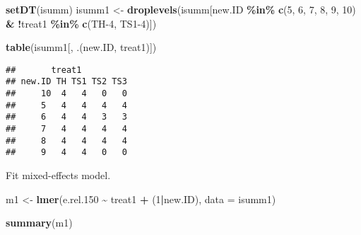\documentclass[
]{article}
\newenvironment{Shaded}{\begin{snugshade}}{\end{snugshade}}
\newcommand{\AttributeTok}[1]{\textcolor[rgb]{0.13,0.29,0.53}{#1}}
\newcommand{\DecValTok}[1]{\textcolor[rgb]{0.00,0.00,0.81}{#1}}
\newcommand{\FloatTok}[1]{\textcolor[rgb]{0.00,0.00,0.81}{#1}}
\newcommand{\FunctionTok}[1]{\textcolor[rgb]{0.13,0.29,0.53}{\textbf{#1}}}
\newcommand{\NormalTok}[1]{#1}
\newcommand{\OtherTok}[1]{\textcolor[rgb]{0.56,0.35,0.01}{#1}}
\newcommand{\SpecialCharTok}[1]{\textcolor[rgb]{0.81,0.36,0.00}{\textbf{#1}}}
\newcommand{\StringTok}[1]{\textcolor[rgb]{0.31,0.60,0.02}{#1}}
\begin{document}
\begin{Shaded}
\begin{Highlighting}[]
\FunctionTok{setDT}\NormalTok{(isumm)}
\NormalTok{isumm1 }\OtherTok{\textless{}{-}} \FunctionTok{droplevels}\NormalTok{(isumm[new.ID }\SpecialCharTok{\%in\%} \FunctionTok{c}\NormalTok{(}\StringTok{\textquotesingle{}5\textquotesingle{}}\NormalTok{, }\StringTok{\textquotesingle{}6\textquotesingle{}}\NormalTok{, }\StringTok{\textquotesingle{}7\textquotesingle{}}\NormalTok{, }\StringTok{\textquotesingle{}8\textquotesingle{}}\NormalTok{, }\StringTok{\textquotesingle{}9\textquotesingle{}}\NormalTok{, }\StringTok{\textquotesingle{}10\textquotesingle{}}\NormalTok{) }\SpecialCharTok{\&} \SpecialCharTok{!}\NormalTok{treat1 }\SpecialCharTok{\%in\%} \FunctionTok{c}\NormalTok{(}\StringTok{\textquotesingle{}TH{-}4\textquotesingle{}}\NormalTok{, }\StringTok{\textquotesingle{}TS1{-}4\textquotesingle{}}\NormalTok{)])}
\end{Highlighting}
\end{Shaded}

\begin{Shaded}
\begin{Highlighting}[]
\FunctionTok{table}\NormalTok{(isumm1[, .(new.ID, treat1)])}
\end{Highlighting}
\end{Shaded}

\begin{verbatim}
##       treat1
## new.ID TH TS1 TS2 TS3
##     10  4   4   0   0
##     5   4   4   4   4
##     6   4   4   3   3
##     7   4   4   4   4
##     8   4   4   4   4
##     9   4   4   0   0
\end{verbatim}

Fit mixed-effects model.

\begin{Shaded}
\begin{Highlighting}[]
\NormalTok{m1 }\OtherTok{\textless{}{-}} \FunctionTok{lmer}\NormalTok{(e.rel}\FloatTok{.150} \SpecialCharTok{\textasciitilde{}}\NormalTok{ treat1 }\SpecialCharTok{+}\NormalTok{ (}\DecValTok{1}\SpecialCharTok{|}\NormalTok{new.ID), }\AttributeTok{data =}\NormalTok{ isumm1)}
\end{Highlighting}
\end{Shaded}

\begin{Shaded}
\begin{Highlighting}[]
\FunctionTok{summary}\NormalTok{(m1)}
\end{Highlighting}
\end{Shaded}
\end{document}
